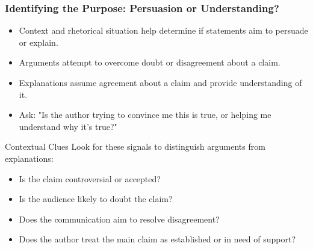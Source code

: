 \documentclass{beamer}
\begin{document}
\begin{frame}
    \frametitle{Identifying the Purpose: Persuasion or Understanding?}
    \begin{itemize}
        \item Context and rhetorical situation help determine if statements aim to persuade or explain.
        \item Arguments attempt to overcome doubt or disagreement about a claim.
        \item Explanations assume agreement about a claim and provide understanding of it.
        \item Ask: "Is the author trying to convince me this is true, or helping me understand why it's true?"
    \end{itemize}
    
    \begin{block}{Contextual Clues}
        Look for these signals to distinguish arguments from explanations:
        \begin{itemize}
            \item Is the claim controversial or accepted?
            \item Is the audience likely to doubt the claim?
            \item Does the communication aim to resolve disagreement?
            \item Does the author treat the main claim as established or in need of support?
        \end{itemize}
    \end{block}
\end{frame}
\end{document}
